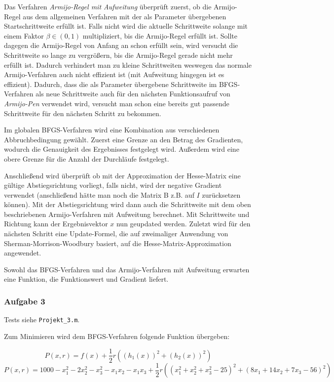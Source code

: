 \documentclass[a4paper, 12pt]{report}
\begin{document}
Das Verfahren \textit{Armijo-Regel mit Aufweitung} überprüft zuerst, ob die Armijo-Regel aus dem allgemeinen Verfahren mit der als
Parameter übergebenen Startschrittweite erfüllt ist. Falls nicht wird die aktuelle Schrittweite solange mit einem Faktor $\beta \in (0, 1)$
multipliziert, bis die Armijo-Regel erfüllt ist. Sollte dagegen die Armijo-Regel von Anfang an schon erfüllt sein, wird versucht die
Schrittweite so lange zu vergrößern, bis die Armijo-Regel gerade nicht mehr erfüllt ist. Dadurch verhindert man zu kleine Schrittweiten
weswegen das normale Armijo-Verfahren auch nicht effizient ist (mit Aufweitung hingegen ist es effizient). Dadurch, dass die als
Parameter übergebene Schrittweite im BFGS-Verfahren als neue Schrittweite auch für den nächsten Funktionsaufruf von \textit{Armijo-Pen}
verwendet wird, versucht man schon eine bereits gut passende Schrittweite für den nächsten Schritt zu bekommen.\par
Im globalen BFGS-Verfahren wird eine Kombination aus verschiedenen Abbruchbedingung gewählt. Zuerst eine Grenze an den Betrag des Gradienten,
wodurch die Genauigkeit des Ergebnisses festgelegt wird. Außerdem wird eine obere Grenze für die Anzahl der Durchläufe festgelegt.\par
Anschließend wird überprüft ob mit der Approximation der Hesse-Matrix eine gültige Abstiegsrichtung vorliegt, falls nicht, wird der
negative Gradient verwendet (anschließend hätte man noch die Matrix B z.B. auf $I$ zurücksetzen können). Mit der Abstiegsrichtung
wird dann auch die Schrittweite mit dem oben beschriebenen Armijo-Verfahren mit Aufweitung berechnet. Mit Schrittweite und Richtung
kann der Ergebnisvektor $x$ nun geupdated werden. Zuletzt wird für den nächsten Schritt eine Update-Formel, die auf zweimaliger Anwendung
von Sherman-Morrison-Woodbury basiert, auf die Hesse-Matrix-Approximation angewendet.\par
Sowohl das BFGS-Verfahren und das Armijo-Verfahren mit Aufweitung erwarten eine Funktion, die Funktionswert und Gradient liefert.

\subsubsection{Aufgabe 3}
Tests siehe \lstinline[basicstyle=\ttfamily\color{black}]|Projekt_3.m|.

Zum Minimieren wird dem BFGS-Verfahren folgende Funktion übergeben:

$$P(x, r) = f(x) + \frac{1}{2}r\left((h_1(x))^2 + (h_2(x))^2\right)$$
$$P(x,r) = 1000 - x_1^2 - 2x_2^2 - x_3^2 - x_1x_2 - x_1x_3 + \frac{1}{2} r \left( \left(x_1^2 + x_2^2 + x_3^2 - 25\right)^2 + \left(8x_1 + 14x_2 + 7x_3 - 56\right)^2 \right)$$
\end{document}
